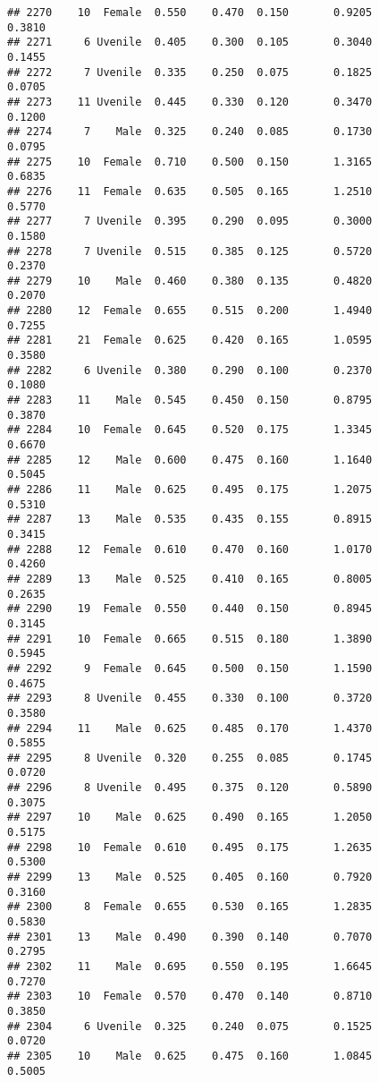 \documentclass[
]{article}
\begin{document}
\begin{verbatim}
## 2270    10  Female  0.550    0.470  0.150       0.9205         0.3810
## 2271     6 Uvenile  0.405    0.300  0.105       0.3040         0.1455
## 2272     7 Uvenile  0.335    0.250  0.075       0.1825         0.0705
## 2273    11 Uvenile  0.445    0.330  0.120       0.3470         0.1200
## 2274     7    Male  0.325    0.240  0.085       0.1730         0.0795
## 2275    10  Female  0.710    0.500  0.150       1.3165         0.6835
## 2276    11  Female  0.635    0.505  0.165       1.2510         0.5770
## 2277     7 Uvenile  0.395    0.290  0.095       0.3000         0.1580
## 2278     7 Uvenile  0.515    0.385  0.125       0.5720         0.2370
## 2279    10    Male  0.460    0.380  0.135       0.4820         0.2070
## 2280    12  Female  0.655    0.515  0.200       1.4940         0.7255
## 2281    21  Female  0.625    0.420  0.165       1.0595         0.3580
## 2282     6 Uvenile  0.380    0.290  0.100       0.2370         0.1080
## 2283    11    Male  0.545    0.450  0.150       0.8795         0.3870
## 2284    10  Female  0.645    0.520  0.175       1.3345         0.6670
## 2285    12    Male  0.600    0.475  0.160       1.1640         0.5045
## 2286    11    Male  0.625    0.495  0.175       1.2075         0.5310
## 2287    13    Male  0.535    0.435  0.155       0.8915         0.3415
## 2288    12  Female  0.610    0.470  0.160       1.0170         0.4260
## 2289    13    Male  0.525    0.410  0.165       0.8005         0.2635
## 2290    19  Female  0.550    0.440  0.150       0.8945         0.3145
## 2291    10  Female  0.665    0.515  0.180       1.3890         0.5945
## 2292     9  Female  0.645    0.500  0.150       1.1590         0.4675
## 2293     8 Uvenile  0.455    0.330  0.100       0.3720         0.3580
## 2294    11    Male  0.625    0.485  0.170       1.4370         0.5855
## 2295     8 Uvenile  0.320    0.255  0.085       0.1745         0.0720
## 2296     8 Uvenile  0.495    0.375  0.120       0.5890         0.3075
## 2297    10    Male  0.625    0.490  0.165       1.2050         0.5175
## 2298    10  Female  0.610    0.495  0.175       1.2635         0.5300
## 2299    13    Male  0.525    0.405  0.160       0.7920         0.3160
## 2300     8  Female  0.655    0.530  0.165       1.2835         0.5830
## 2301    13    Male  0.490    0.390  0.140       0.7070         0.2795
## 2302    11    Male  0.695    0.550  0.195       1.6645         0.7270
## 2303    10  Female  0.570    0.470  0.140       0.8710         0.3850
## 2304     6 Uvenile  0.325    0.240  0.075       0.1525         0.0720
## 2305    10    Male  0.625    0.475  0.160       1.0845         0.5005

\end{verbatim}
\end{document}
